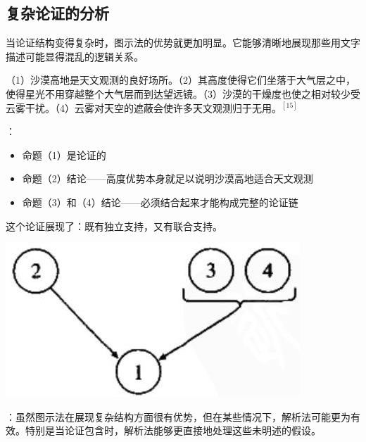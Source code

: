 \subsection{复杂论证的分析}

当论证结构变得复杂时，图示法的优势就更加明显。它能够清晰地展现那些用文字描述可能显得混乱的逻辑关系。

\begin{examplebox}[title=混合支持模式的复杂论证]
\begin{displayquote}
（1）沙漠高地是天文观测的良好场所。（2）其高度使得它们坐落于大气层之中，使得星光不用穿越整个大气层而到达望远镜。（3）沙漠的干燥度也使之相对较少受云雾干扰。（4）云雾对天空的遮蔽会使许多天文观测归于无用。${}^{[15]}$
\end{displayquote}

：
\begin{itemize}
  \item 命题（1）是论证的
  \item 命题（2）结论——高度优势本身就足以说明沙漠高地适合天文观测
  \item 命题（3）和（4）结论——必须结合起来才能构成完整的论证链
\end{itemize}

这个论证展现了：既有独立支持，又有联合支持。
\end{examplebox}

\begin{center}
\includegraphics[width=\textwidth]{images/2025_05_15_6a28331d5e7c993ad07ag-031.jpg}
\end{center}

：虽然图示法在展现复杂结构方面很有优势，但在某些情况下，解析法可能更为有效。特别是当论证包含时，解析法能够更直接地处理这些未明述的假设。

